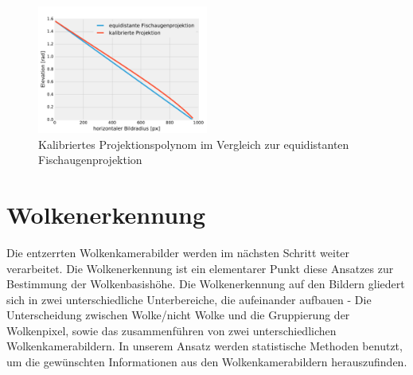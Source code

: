 \documentclass[a4paper,11pt,twoside,german]{article}
\begin{document}
\begin{figure}[!h]
\begin{center}
\includegraphics[width=0.5\textwidth]{media/projection-calibration.pdf}
\vspace{-0.7cm}
\caption[Kalibrierte Projektionsfunktion]{Kalibriertes Projektionspolynom im
Vergleich zur equidistanten Fischaugenprojektion}
\label{FIGProjektioncalib}
\end{center}
\end{figure}


\section{Wolkenerkennung}
\label{SECWolkenErkennung}
Die entzerrten Wolkenkamerabilder werden im nächsten Schritt weiter verarbeitet. Die Wolkenerkennung ist ein elementarer Punkt diese Ansatzes zur Bestimmung der Wolkenbasishöhe. Die Wolkenerkennung auf den Bildern gliedert sich in zwei unterschiedliche Unterbereiche, die aufeinander aufbauen - Die Unterscheidung zwischen Wolke/nicht Wolke und die Gruppierung der Wolkenpixel, sowie das zusammenführen von zwei unterschiedlichen Wolkenkamerabildern. In unserem Ansatz werden statistische Methoden benutzt, um die gewünschten Informationen aus den Wolkenkamerabildern herauszufinden.
\end{document}
